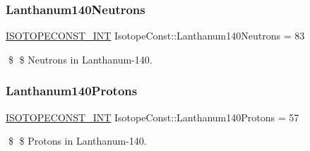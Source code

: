 \subsubsection{\texorpdfstring{Lanthanum140\+Neutrons}{Lanthanum140Neutrons}}
{\footnotesize\ttfamily \mbox{\hyperlink{group___isotope_const-_macros_ga5f18360b3e99483a35c32d789e62621c}{I\+S\+O\+T\+O\+P\+E\+C\+O\+N\+S\+T\+\_\+\+I\+NT}} Isotope\+Const\+::\+Lanthanum140\+Neutrons = 83}

\$ \$ Neutrons in Lanthanum-\/140. \mbox{\label{group___isotope_const-_lanthanum-_la140_gab68fd70bfcaccbbb7fe83f1f9bb7c3b2}} 
\subsubsection{\texorpdfstring{Lanthanum140\+Protons}{Lanthanum140Protons}}
{\footnotesize\ttfamily \mbox{\hyperlink{group___isotope_const-_macros_ga5f18360b3e99483a35c32d789e62621c}{I\+S\+O\+T\+O\+P\+E\+C\+O\+N\+S\+T\+\_\+\+I\+NT}} Isotope\+Const\+::\+Lanthanum140\+Protons = 57}

\$ \$ Protons in Lanthanum-\/140. 